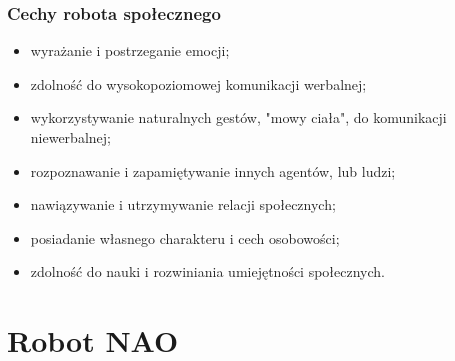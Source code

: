 \subsubsection{Cechy robota społecznego}
\begin{itemize}
    \setlength\itemsep{0em}
    \item wyrażanie i postrzeganie emocji;
    \item zdolność do wysokopoziomowej komunikacji werbalnej; 
    \item wykorzystywanie naturalnych gestów, "mowy ciała", do komunikacji niewerbalnej;
    \item rozpoznawanie i zapamiętywanie innych agentów, lub ludzi;
    \item nawiązywanie i utrzymywanie relacji społecznych;
    \item posiadanie własnego charakteru i cech osobowości;
    \item zdolność do nauki i rozwiniania umiejętności społecznych.
\end{itemize}


\section{Robot NAO}
